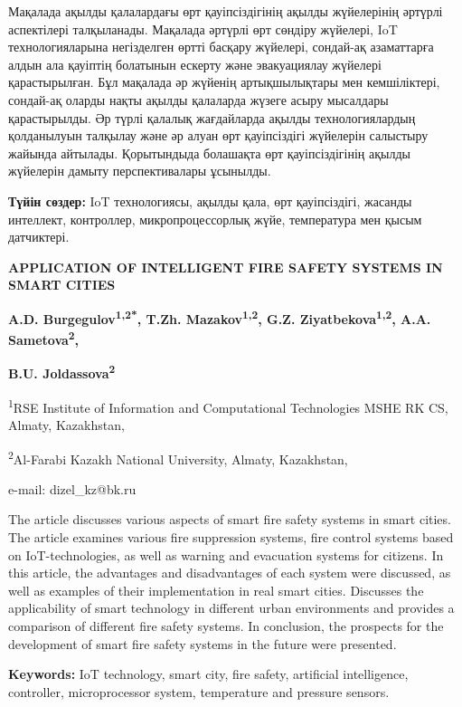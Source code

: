 Мақалада ақылды қалалардағы өрт қауіпсіздігінің ақылды
жүйелерінің әртүрлі аспектілері талқыланады. Мақалада әртүрлі өрт
сөндіру жүйелері, IoT технологияларына негізделген өртті басқару
жүйелері, сондай-ақ азаматтарға алдын ала қауіптің болатынын ескерту
және эвакуациялау жүйелері қарастырылған. Бұл мақалада әр жүйенің
артықшылықтары мен кемшіліктері, сондай-ақ оларды нақты ақылды қалаларда
жүзеге асыру мысалдары қарастырылды. Әр түрлі қалалық жағдайларда ақылды
технологиялардың қолданылуын талқылау және әр алуан өрт қауіпсіздігі
жүйелерін салыстыру жайында айтылады. Қорытындыда болашақта өрт
қауіпсіздігінің ақылды жүйелерін дамыту перспективалары
ұсынылды.

{\bfseries Түйін сөздер:} IoT технологиясы,
ақылды қала, өрт қауіпсіздігі, жасанды интеллект, контроллер,
микропроцессорлық жүйе, температура мен қысым
датчиктері.

\begin{center}
{\large\bfseries APPLICATION OF INTELLIGENT FIRE SAFETY SYSTEMS IN SMART CITIES}

\vspace{1em}
{\bfseries A.D. Burgegulov\textsuperscript{1,2*}, T.Zh.
Mazakov\textsuperscript{1,2}, G.Z. Ziyatbekova\textsuperscript{1,2},
A.A. Sametova\textsuperscript{2},}

{\bfseries B.U. Joldassova\textsuperscript{2}}

\textsuperscript{1}RSE Institute of Information and Computational
Technologies MSHE RK CS, Almaty, Kazakhstan,

\textsuperscript{2}Al-Farabi Kazakh National
University, Almaty, Kazakhstan,

e-mail: dizel\_kz@bk.ru
\end{center}

The article discusses various aspects of smart fire safety
systems in smart cities. The article examines various fire suppression
systems, fire control systems based on IoT-technologies, as well as
warning and evacuation systems for citizens. In this article, the
advantages and disadvantages of each system were discussed, as well as
examples of their implementation in real smart cities. Discusses the
applicability of smart technology in different urban environments and
provides a comparison of different fire safety systems. In conclusion,
the prospects for the development of smart fire safety systems in the
future were
presented.

{\bfseries Keywords:} IoT technology, smart
city, fire safety, artificial intelligence, controller, microprocessor
system, temperature and pressure
sensors.

